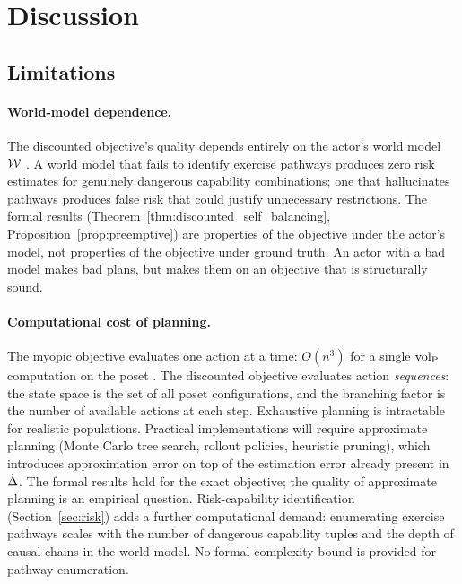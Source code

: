 \section{Discussion}
\label{sec:discussion}

\subsection{Limitations}

\paragraph{World-model dependence.} The discounted objective's quality depends
entirely on the actor's world model $\mathcal{W}$
\citep{amodei2016concrete}. A world model that fails to identify exercise
pathways produces zero risk estimates for genuinely dangerous
capability combinations; one that hallucinates pathways produces false risk
that could justify unnecessary restrictions. The formal results
(Theorem~\ref{thm:discounted_self_balancing},
Proposition~\ref{prop:preemptive}) are properties of the objective under the
actor's model, not properties of the objective under ground truth. An actor
with a bad model makes bad plans, but makes them on an objective that is
structurally sound.

\paragraph{Computational cost of planning.} The myopic objective evaluates
one action at a time: $O(n^3)$ for a single ${\operatorname{vol}_{\mathrm{P}}}$ computation on the poset
\citep{lasser2026poset}. The discounted objective evaluates action
\emph{sequences}: the state space is the set of all poset configurations,
and the branching factor is the number of available actions at each step.
Exhaustive planning is intractable for realistic populations. Practical implementations will require approximate planning
\citep{sutton2018reinforcement} (Monte Carlo tree search, rollout policies,
heuristic pruning), which introduces approximation error
on top of the estimation error already present in $\hat{\Delta}$. The formal
results hold for the exact objective; the quality of approximate planning is
an empirical question. Risk-capability identification
(Section~\ref{sec:risk}) adds a further computational demand: enumerating
exercise pathways scales with the number of dangerous capability tuples and
the depth of causal chains in the world model. No formal complexity bound is
provided for pathway enumeration.

